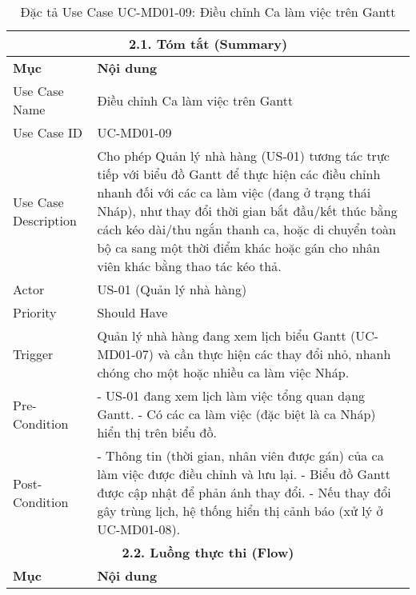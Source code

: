 \begin{longtable}{|m{4cm}|p{11cm}|}
\caption{Đặc tả Use Case UC-MD01-09: Điều chỉnh Ca làm việc trên Gantt} \label{tab:uc_md01_09_revised} \\
\hline
\multicolumn{2}{|c|}{\textbf{2.1. Tóm tắt (Summary)}} \\
\hline
\textbf{Mục} & \textbf{Nội dung} \\
\hline
\endhead %
\hline
\endfoot %
\hline
\endlastfoot %
Use Case Name & Điều chỉnh Ca làm việc trên Gantt \\
\hline
Use Case ID & UC-MD01-09 \\
\hline
Use Case Description & Cho phép Quản lý nhà hàng (US-01) tương tác trực tiếp với biểu đồ Gantt để thực hiện các điều chỉnh nhanh đối với các ca làm việc (đang ở trạng thái Nháp), như thay đổi thời gian bắt đầu/kết thúc bằng cách kéo dài/thu ngắn thanh ca, hoặc di chuyển toàn bộ ca sang một thời điểm khác hoặc gán cho nhân viên khác bằng thao tác kéo thả. \\
\hline
Actor & US-01 (Quản lý nhà hàng) \\
\hline
Priority & Should Have \\
\hline
Trigger & Quản lý nhà hàng đang xem lịch biểu Gantt (UC-MD01-07) và cần thực hiện các thay đổi nhỏ, nhanh chóng cho một hoặc nhiều ca làm việc Nháp. \\
\hline
Pre-Condition & - US-01 đang xem lịch làm việc tổng quan dạng Gantt. \newline - Có các ca làm việc (đặc biệt là ca Nháp) hiển thị trên biểu đồ. \\
\hline
Post-Condition & - Thông tin (thời gian, nhân viên được gán) của ca làm việc được điều chỉnh và lưu lại. \newline - Biểu đồ Gantt được cập nhật để phản ánh thay đổi. \newline - Nếu thay đổi gây trùng lịch, hệ thống hiển thị cảnh báo (xử lý ở UC-MD01-08). \\
\hline
\multicolumn{2}{|c|}{\textbf{2.2. Luồng thực thi (Flow)}} \\
\hline
\textbf{Mục} & \textbf{Nội dung} \\
\hline

\end{longtable}
